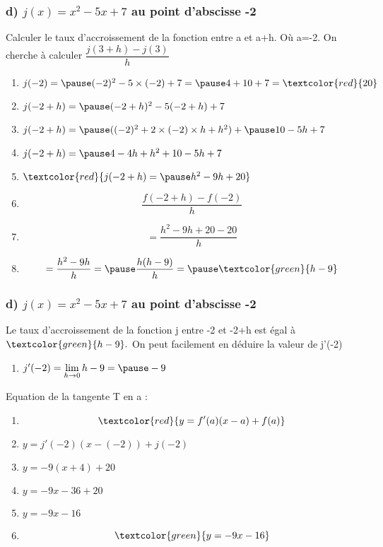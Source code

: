 \documentclass[t]{beamer}
\begin{document}
	\begin{frame}
		\frametitle{d) $j(x) = x^2 - 5x +7$ au point d'abscisse -2}
		\pause
		Calculer le taux d'accroissement de la fonction entre a et a+h. \pause Où a=-2.
		\pause
		On cherche à calculer \( \dfrac{j(3+h) - j(3)}{h} \)
		\pause
		\begin{enumerate}[]
			\item \(j(-2)= \pause (-2)^2 - 5\times (-2) + 7 = \pause 4 + 10 + 7 = \textcolor{red}{20} \)
			\pause
			\item \(j(-2+h)= \pause(-2+h)^2 - 5(-2+h) + 7 \)
			\pause
			\item \(j(-2+h)= \pause ((-2)^2+ 2 \times (-2) \times h + h^2) + \pause 10 - 5h + 7 \)
			\pause
			\item \(j(-2+h)= \pause 4 - 4h + h^2 + 10 - 5h + 7 \)
			\pause
			\item \(\textcolor{red}{j(-2+h)= \pause h^2 -9h + 20} \)
			\pause
			\item \[\dfrac{f(-2+h)-f(-2)}{h}\]
			\pause
			\item \[=\dfrac{h^2-9h+20-20}{h}\]
			\pause
			\item \[=\dfrac{h^2-9h}{h} = \pause \dfrac{h(h-9)}{h} = \pause \textcolor{green}{h-9} \]
			\pause
		\end{enumerate}
	\end{frame}

	\begin{frame}
		\frametitle{d) $j(x) = x^2 - 5x +7$ au point d'abscisse -2}
		\pause
		Le taux d'accroissement de la fonction j entre -2 et -2+h est égal à \pause $\textcolor{green}{h-9}.$ \pause On peut facilement en déduire la valeur de j'(-2)
		\pause
		\begin{enumerate}[]
			\item<+-> \(j'(-2) = \lim\limits_{h \rightarrow 0}h-9 = \pause -9 \)
		\end{enumerate}
		\pause
		Equation de la tangente T en a :
		\pause
		\begin{enumerate}[]
			\item<+-> \[\textcolor{red}{y = f'(a)(x-a) + f(a)}\]
			\item<+-> \(y=j'(-2)(x-(-2)) + j(-2) \)
			\item<+-> \(y= -9(x+4) + 20\)
			\item<+-> \(y= -9x-36+20\)
			\item<+-> \(y= -9x-16 \)
			\pause
			\item<+-> \[\textcolor{green}{y = -9x-16 }\]
		\end{enumerate}
	\end{frame}
\end{document}
